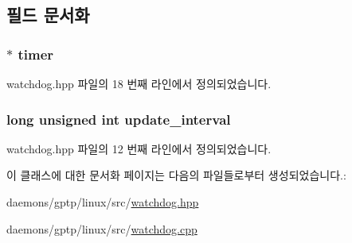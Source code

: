 \subsection{필드 문서화}
\subsubsection[{\texorpdfstring{timer}{timer}}]{$\ast$ timer\hspace{0.3cm}{\ttfamily [private]}}\hypertarget{class_systemd_watchdog_handler_a3538b19062f2d1aa1bcf5b899425be13}{}\label{class_systemd_watchdog_handler_a3538b19062f2d1aa1bcf5b899425be13}


watchdog.\+hpp 파일의 18 번째 라인에서 정의되었습니다.

\subsubsection[{\texorpdfstring{update\+\_\+interval}{update_interval}}]{\setlength{\rightskip}{0pt plus 5cm}long unsigned int update\+\_\+interval}\hypertarget{class_systemd_watchdog_handler_a2804381da4d285ba95ca3e5736956731}{}\label{class_systemd_watchdog_handler_a2804381da4d285ba95ca3e5736956731}


watchdog.\+hpp 파일의 12 번째 라인에서 정의되었습니다.



이 클래스에 대한 문서화 페이지는 다음의 파일들로부터 생성되었습니다.\+:\begin{DoxyCompactItemize}
\item 
daemons/gptp/linux/src/\hyperlink{watchdog_8hpp}{watchdog.\+hpp}\item 
daemons/gptp/linux/src/\hyperlink{watchdog_8cpp}{watchdog.\+cpp}\end{DoxyCompactItemize}
